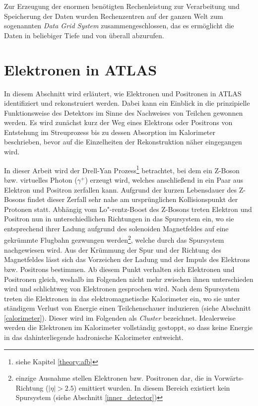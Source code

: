 Zur Erzeugung der enormen benötigten Rechenleistung zur Verarbeitung und
Speicherung der Daten wurden Rechenzentren auf der ganzen Welt zum sogenannten
\textit{Data Grid System} zusammengeschlossen, das es ermöglicht die Daten in
beliebiger Tiefe und von überall abzurufen.


%
\section{Elektronen in ATLAS}
\label{electrons}

In diesem Abschnitt wird erläutert, wie Elektronen und Positronen in ATLAS
identifiziert und rekonstruiert werden. Dabei kann ein Einblick in die
prinzipielle Funktionsweise des Detektors im Sinne des Nachweises von Teilchen
gewonnen werden. Es wird zunächst kurz der Weg eines Elektrons oder Positrons
von Entstehung im Streuprozess bis zu dessen Absorption im Kalorimeter
beschrieben, bevor auf die Einzelheiten der Rekonstruktion näher eingegangen
wird.

In dieser Arbeit wird der Drell-Yan Prozess\footnote{siehe Kapitel
\ref{theory:afb}} betrachtet, bei dem ein Z-Boson bzw. virtuelles Photon
($\gamma^+$) erzeugt wird, welches anschließend in ein Paar aus Elektron und
Positron zerfallen kann. Aufgrund der kurzen Lebensdauer des Z-Bosons findet
dieser Zerfall sehr nahe am ursprünglichen Kollisionspunkt der Protonen statt.
Abhängig vom Lo"-rentz-Boost des Z-Bosons treten Elektron und Positron nun in
unterschiedlichen Richtungen in das Spursystem ein, wo sie entsprechend ihrer
Ladung aufgrund des solenoiden Magnetfeldes auf eine gekrümmte Flugbahn
gezwungen werden\footnote{einzige Ausnahme stellen Elektronen bzw. Positronen
dar, die in Vorwärts-Richtung ($|\eta|>2.5$) emittiert wurden. In diesem
Bereich existiert kein Spursystem (siehe Abschnitt \ref{inner_detector})},
welche durch das Spursystem nachgewiesen wird. Aus der Krümmung der Spur und
der Richtung des Magnetfeldes lässt sich das Vorzeichen der Ladung und der
Impuls des Elektrons bzw. Positrons bestimmen. Ab diesem Punkt verhalten sich
Elektronen und Positronen gleich, weshalb im Folgenden nicht mehr zwischen
ihnen unterschieden wird und schlichtweg von Elektronen gesprochen wird. Nach
dem Spursystem treten die Elektronen in das elektromagnetische Kalorimeter ein,
wo sie unter ständigem Verlust von Energie einen Teilchenschauer induzieren
(siehe Abschnitt \ref{calorimeter}). Dieser wird im Folgenden als
\textit{Cluster} bezeichnet. Idealerweise werden die Elektronen im Kalorimeter
vollständig gestoppt, so dass keine Energie in das dahinterliegende hadronische
Kalorimeter entweicht.



